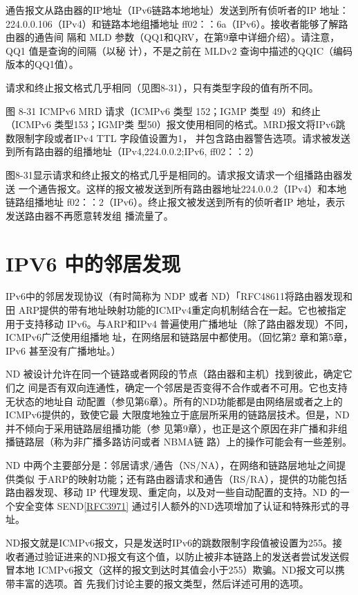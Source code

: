 通告报文从路由器的IP地址（IPv6链路本地地址）发送到所有侦听者的IP 地址：
224.0.0.106（IPv4）和链路本地组播地址 ff02：：6a（IPv6）。接收者能够了解路由器的通告间
隔和 MLD 参数（QQ1和QRV，在第9章中详细介绍）。请注意，QQ1 值是查询的间隔（以秘
计），不是之前在 MLDv2 查询中描述的QQIC（编码版本的QQ1值）。

请求和终止报文格式几乎相同（见图8-31），只有类型字段的值有所不同。

图 8-31
ICMPv6 MRD 请求（ICMPv6 类型 152；IGMP 类型 49）和终止（ICMPv6 类型153；IGMP类
型50）报文使用相同的格式。MRD报文将IPv6跳数限制字段或者IPv4 TTL 字段值设置为1，
并包含路由器警告选项。请求被发送到所有路由器的组播地址（IPv4,224.0.0.2;IPv6, ff02：：2）

图8-31显示请求和终止报文的格式几乎是相同的。请求报文请求一个组播路由器发送
一个通告报文。这样的报文被发送到所有路由器地址224.0.0.2（IPv4）和本地链路组播地址
f02：：2（IPv6）。终止报文被发送到所有的侦听者IP 地址，表示发送路由器不再愿意转发组
播流量了。

\section{IPV6 中的邻居发现}

IPv6中的邻居发现协议（有时简称为 NDP 或者 ND）「RFC48611将路由器发现和田
ARP提供的带有地址映射功能的ICMPv4重定向机制结合在一起。它也被指定用于支持移动
IPv6。与ARP和IPv4 普遍使用广播地址（除了路由器发现）不同，ICMPv6广泛使用组播地
址，在网络层和链路层中都使用。（回忆第2 章和第5章，IPv6 甚至没有广播地址。）

ND 被设计允许在同一个链路或者网段的节点（路由器和主机）找到彼此，确定它们之
间是否有双向连通性，确定一个邻居是否变得不合作或者不可用。它也支持无状态的地址自
动配置（参见第6章）。所有的ND功能都是由网络层或者之上的ICMPv6提供的，致使它最
大限度地独立于底层所采用的链路层技术。但是，ND 并不倾向于采用链路层组播功能（参
见第9章），也正是这个原因在非广播和非组播链路层（称为非广播多路访问或者 NBMA链
路）上的操作可能会有一些差别。

ND 中两个主要部分是：邻居请求/通告（NS/NA），在网络和链路层地址之间提供类似
于ARP的映射功能；还有路由器请求和通告（RS/RA），提供的功能包括路由器发现、移动
IP 代理发现、重定向，以及对一些自动配置的支持。ND 的一个安全变体
SEND\href{https://www.rfc-editor.org/rfc/rfc3971}{[RFC3971]}
通过引人额外的ND选项增加了认证和特殊形式的寻址。

ND报文就是ICMPv6报文，只是发送时IPv6的跳数限制字段值被设置为255。接
收者通过验证进来的ND报文有这个值，以防止被非本链路上的发送者尝试发送假冒本地
ICMPv6报文（这样的报文到达时其值会小于255）欺骗。ND报文可以携带丰富的选项。首
先我们讨论主要的报文类型，然后详述可用的选项。


